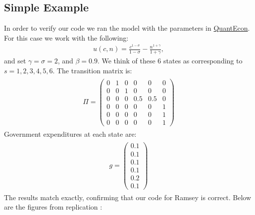 \documentclass[12pt]{article}
\begin{document}
\subsection*{Simple Example}
In order to verify our code we ran the model with the parameters in \href{https://python-advanced.quantecon.org/opt_tax_recur.html}{QuantEcon}. For this case we work with the following:
\begin{align*}
u(c,n) = {\frac{c^{1-\sigma}}{1-\sigma}} - {\frac{n^{1+\gamma}}{1+\gamma}},
\end{align*}
and set $\gamma = \sigma = 2$, and $\beta = 0.9$. We think of these 6 states as corresponding to $s=1,2,3,4,5,6$. The transition matrix is:
\begin{align*}
\begin{split}
\Pi = \left(\begin{matrix}0 & 1 & 0 & 0   & 0   & 0\\
                          0 & 0 & 1 & 0   & 0   & 0\\
                          0 & 0 & 0 & 0.5 & 0.5 & 0\\
                          0 & 0 & 0 & 0   & 0   & 1\\
                          0 & 0 & 0 & 0   & 0   & 1\\
                          0 & 0 & 0 & 0   & 0   & 1\end{matrix}\right)
\end{split}
\end{align*}
Government expenditures at each state are:
\begin{align*}
\begin{split}
g = \left(\begin{matrix} 0.1\\0.1\\0.1\\0.1\\0.2\\0.1 \end{matrix}\right)
\end{split}
\end{align*}
The results match exactly, confirming that our code for Ramsey is correct. Below are the figures from replication :
\end{document}
